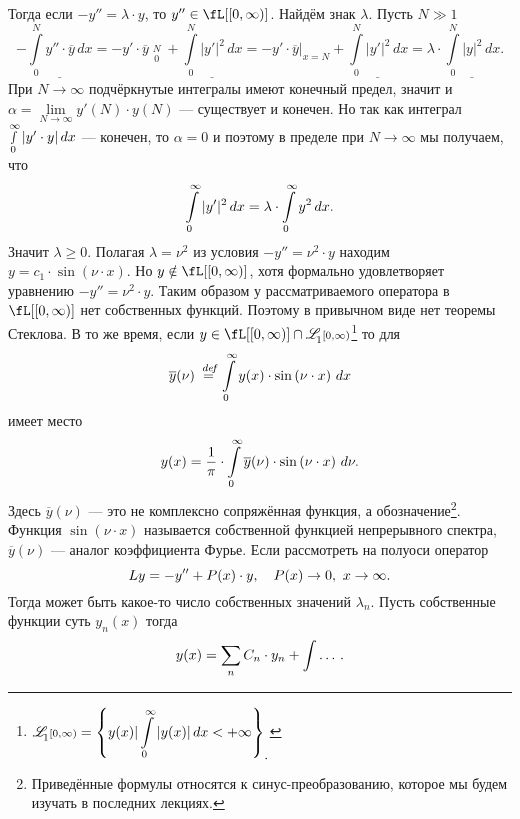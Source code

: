 Тогда если $-y''=\lambda\cdot y$, то $y''\in\fL[{[0,\infty)}]$. Найдём знак $\lambda$. Пусть $N\gg1$
\begin{equation*}
	-\underline{\int\limits_0^N y''\cdot\overline{y}\,dx}=-y'\cdot\overline{y}\mathop{\Big|}\limits_{0}^{N}+\underline{\int\limits_0^N|y'|^2\,dx}=-y'\cdot\overline{y}\Big|_{x=N}+\underline{\int\limits_0^N|y'|^2\,dx}=\lambda\cdot\underline{\int\limits_0^N|y|^2\,dx}.
\end{equation*}    
При $N\to\infty$ подчёркнутые интегралы имеют конечный предел, значит и $\alpha=\lim\limits_{N\to\infty}y'(N)\cdot y(N)$ --- существует и конечен. Но так как интеграл  $\smallint\limits_0^{\infty}|y'\cdot y|\,dx$ --- конечен, то $\alpha=0$ и поэтому в пределе при $N\to\infty$ мы получаем, что
\begin{equation*}
	\hfill\int\limits_0^{\infty}|y'|^2\,dx=\lambda\cdot\int\limits_0^{\infty}y^2\,dx.\hfill
\end{equation*}
Значит $\lambda\geqslant0$. Полагая $\lambda=\nu^2$ из условия $-y''=\nu^2\cdot y$ находим $y=c_1\cdot\sin\left(\nu\cdot x\right)$. Но $y\notin\fL[{[0,\infty)}]$, хотя формально удовлетворяет уравнению $-y''=\nu^2\cdot y$. Таким образом у рассматриваемого оператора в $\fL[{[0,\infty)}]$ нет собственных функций. Поэтому в привычном виде нет теоремы Стеклова. В то же время, если $y\in\fL[{[0,\infty)}]\cap\fLone[{[0,\infty)}]$\footnote{$\displaystyle\fLone[{[0,\infty)}]=\left\{y(x)|\int\limits_{0}^{\infty}|y(x)|\,dx<+\infty\right\}_{\displaystyle.}$} то для 
\begin{equation*}
	\hfill \overline{y}(\nu)\eqdef\int\limits_0^{\infty}y(x)\cdot\sin\left(\nu\cdot x\right)\,dx\hfill
\end{equation*}
имеет место 
\begin{equation*}
	\hfill y(x)=\frac{1}{\pi}\cdot\int\limits_0^{\infty}\overline{y}(\nu)\cdot\sin\left(\nu\cdot x\right)\,d\nu.\hfill
\end{equation*}
Здесь $\overline{y}(\nu)$ --- это не комплексно сопряжённая функция, а обозначение\footnote{Приведённые формулы относятся к синус-преобразованию, которое мы будем изучать в последних лекциях.}.
Функция $\sin\left(\nu\cdot x\right)$ называется собственной функцией непрерывного спектра, $\overline{y}(\nu)$ --- аналог коэффициента Фурье. Если рассмотреть на полуоси оператор 
\begin{equation*}
	\hfill Ly=-y''+P(x)\cdot y,\quad P(x)\to0,\ x\to\infty.\hfill
\end{equation*}
Тогда может быть какое-то число собственных значений $\lambda_n$. Пусть собственные функции суть $y_n(x)$ тогда
\begin{equation*}
	\hfill y(x)=\sum\limits_{n}C_n\cdot y_n+\int\dots\,.\hfill
\end{equation*}
